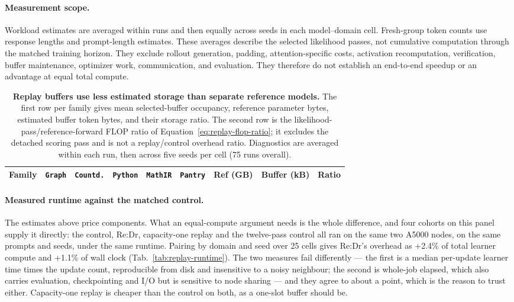 \paragraph{Measurement scope.}
Workload estimates are averaged within runs and then equally across seeds
in each model--domain cell. Fresh-group token counts use response lengths
and prompt-length estimates. These averages describe the selected likelihood
passes, not cumulative computation through the matched training horizon.
They exclude rollout generation, padding, attention-specific costs,
activation recomputation, verification, buffer maintenance, optimizer work,
communication, and evaluation. They therefore do not establish an
end-to-end speedup or an advantage at equal total compute.

\begin{table}[t]
  \centering
  \caption{\textbf{Replay buffers use less estimated storage than separate reference models.}
  The first row per family gives mean selected-buffer occupancy, reference
  parameter bytes, estimated buffer token bytes, and their storage ratio. The
  second row is the likelihood-pass/reference-forward FLOP ratio of
  Equation~\eqref{eq:replay-flop-ratio}; it excludes the detached scoring pass
  and is not a replay/control overhead ratio. Diagnostics are averaged within
  each run, then across five seeds per cell (75 runs overall).}
  \label{tab:replay-cost}
  \scriptsize
  \setlength{\tabcolsep}{4.2pt}
  \begin{tabular}{@{}lrrrrrrrr@{}}
    \toprule
    \textbf{Family} & \textbf{\texttt{Graph}} & \textbf{\texttt{Countd.}} & \textbf{\texttt{Python}}
      & \textbf{\texttt{MathIR}} & \textbf{\texttt{Pantry}} & \textbf{Ref (GB)}
      & \textbf{Buffer (kB)} & \textbf{Ratio} \\
    \midrule
    
  \end{tabular}
\end{table}

\paragraph{Measured runtime against the matched control.}
The estimates above price components. What an equal-compute argument needs is
the whole difference, and four cohorts on this panel supply it directly: the
control, Re:Dr, capacity-one replay and the twelve-pass control all ran on the
same two A5000 nodes, on the same prompts and seeds, under the same
runtime. Pairing by domain and seed over 25 cells gives Re:Dr's
overhead as +2.4\% of total learner compute and
+1.1\% of wall clock (Tab.~\ref{tab:replay-runtime}). The two
measures fail differently --- the first is a median per-update learner time
times the update count, reproducible from disk and insensitive to a noisy
neighbour; the second is whole-job elapsed, which also carries evaluation,
checkpointing and I/O but is sensitive to node sharing --- and they agree to
about a point, which is the reason to trust either. Capacity-one replay is
cheaper than the control on both, as a one-slot buffer should be.

